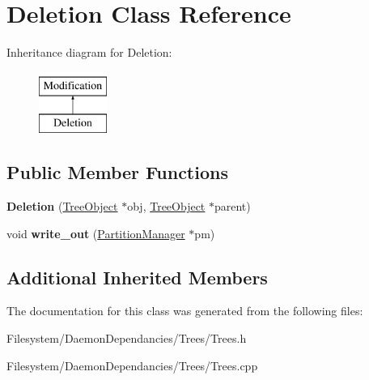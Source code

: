 \hypertarget{classDeletion}{}\section{Deletion Class Reference}
\label{classDeletion}
Inheritance diagram for Deletion\+:\begin{figure}[H]
\begin{center}
\leavevmode
\includegraphics[height=2.000000cm]{classDeletion}
\end{center}
\end{figure}
\subsection*{Public Member Functions}
\begin{DoxyCompactItemize}
\item 
{\bfseries Deletion} (\hyperlink{classTreeObject}{Tree\+Object} $\ast$obj, \hyperlink{classTreeObject}{Tree\+Object} $\ast$parent)\hypertarget{classDeletion_a8446318e3f7004ef557b6021350fa389}{}\label{classDeletion_a8446318e3f7004ef557b6021350fa389}

\item 
void {\bfseries write\+\_\+out} (\hyperlink{classPartitionManager}{Partition\+Manager} $\ast$pm)\hypertarget{classDeletion_ac5bdb21c4a8dbc8afea9910435e509a8}{}\label{classDeletion_ac5bdb21c4a8dbc8afea9910435e509a8}

\end{DoxyCompactItemize}
\subsection*{Additional Inherited Members}


The documentation for this class was generated from the following files\+:\begin{DoxyCompactItemize}
\item 
Filesystem/\+Daemon\+Dependancies/\+Trees/Trees.\+h\item 
Filesystem/\+Daemon\+Dependancies/\+Trees/Trees.\+cpp\end{DoxyCompactItemize}
